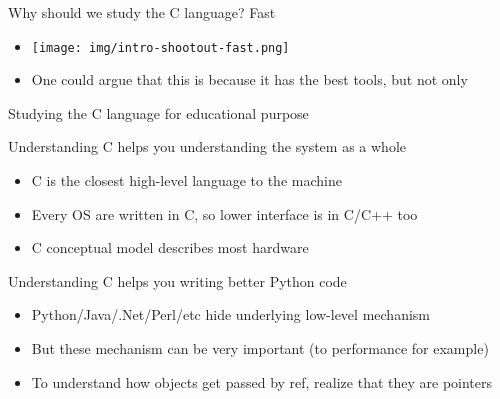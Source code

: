 \begin{frame}{Why should we study the C language? Fast}
  \begin{itemize}
  \item {}
    \texttt{[image: img/intro-shootout-fast.png]}

  \item One could argue that this is because it has the best tools, but not
    only 
  \end{itemize}
\end{frame}
\begin{frame}{Studying the C language for educational purpose}
  \begin{block}{Understanding C helps you understanding the system as a whole}
    \begin{itemize}
    \item C is the closest high-level language to the machine
    \item Every OS are written in C, so lower interface is in C/C++ too
    \item {} C conceptual model describes
      most hardware
    \end{itemize}
  \end{block}
  \begin{block}{Understanding C helps you writing better Python code}
    \begin{itemize}
    \item Python/Java/.Net/Perl/etc hide underlying low-level mechanism
    \item But these mechanism can be very important (to performance for example)
    \item To understand how objects get passed by ref, realize that they are
      pointers
    \end{itemize}
  \end{block}
\end{frame}
